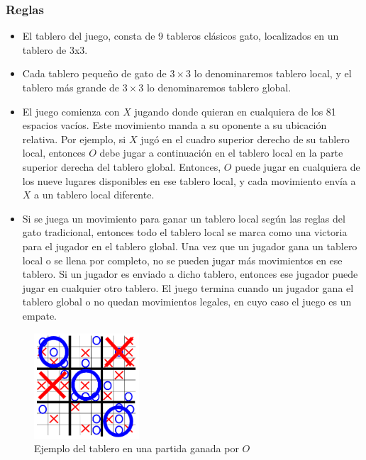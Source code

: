 \documentclass[runningheads]{llncs}
\begin{document}
\subsubsection{Reglas}
\begin{itemize}
    \item El tablero del juego, consta de 9 tableros clásicos gato, localizados en un tablero de 3x3.
    \item Cada tablero pequeño de gato de $3 \times 3$ lo denominaremos tablero local, y el tablero más grande de $3 \times 3$ lo denominaremos tablero global.
    \item El juego comienza con $X$ jugando donde quieran en cualquiera de los 81 espacios vacíos. Este movimiento manda a su oponente a su ubicación relativa. Por ejemplo, si $X$ jugó en el cuadro superior derecho de su tablero local, entonces $O$ debe jugar a continuación en el tablero local en la parte superior derecha del tablero global. Entonces, $O$ puede jugar en cualquiera de los nueve lugares disponibles en ese tablero local, y cada movimiento envía a $X$ a un tablero local diferente.
    
    \item Si se juega un movimiento para ganar un tablero local según las reglas del gato tradicional, entonces todo el tablero local se marca como una victoria para el jugador en el tablero global. Una vez que un jugador gana un tablero local o se llena por completo, no se pueden jugar más movimientos en ese tablero. Si un jugador es enviado a dicho tablero, entonces ese jugador puede jugar en cualquier otro tablero. El juego termina cuando un jugador gana el tablero global o no quedan movimientos legales, en cuyo caso el juego es un empate.

\end{itemize}
\begin{figure}[h]
\centering
\includegraphics[width=0.35\textwidth]{images/image.png}
\caption{Ejemplo del tablero en una partida ganada por $O$}
\end{figure}
\end{document}
